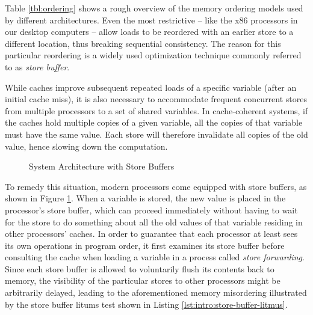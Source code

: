 Table \ref{tbl:ordering} shows a rough overview of the memory ordering models used by different architectures.
Even the most restrictive -- like the x86 processors in our desktop computers -- allow loads to be reordered with an earlier store to a different location, thus breaking sequential consistency.
The reason for this particular reordering is a widely used optimization technique commonly referred to as \emph{store buffer}.

While caches improve subsequent repeated loads of a specific variable (after an initial cache miss),
it is also necessary to accommodate frequent concurrent stores from multiple processors to a set of shared variables.
In cache-coherent systems, if the caches hold multiple copies of a given variable, all the copies of that variable must have the same value.
Each store will therefore invalidate all copies of the old value,
hence slowing down the computation. %


\begin{figure}[!h]
  \centering
  
  \caption{System Architecture with Store Buffers}
  \label{fig:intro:store-buffer-architecture}
\end{figure}

To remedy this situation, modern processors come equipped with store buffers, as shown in Figure \ref{fig:intro:store-buffer-architecture}.
When a variable is stored, the new value is placed in the processor's store buffer, which can proceed immediately without having to wait for the store to do something about all the old values of that variable residing in other processors' caches.
In order to guarantee that each processor at least sees its own operations in program order, it first examines its store buffer before consulting the cache when loading a variable in a process called \emph{store forwarding}.
Since each store buffer is allowed to voluntarily flush its contents back to memory, the visibility of the particular stores to other processors might be arbitrarily delayed, leading to the aforementioned memory misordering
illustrated by the store buffer litums test shown in Listing \ref{lst:intro:store-buffer-litmus}.

